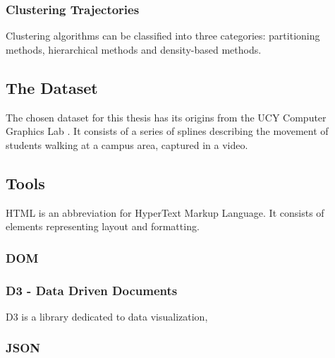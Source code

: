 \documentclass{article}
\begin{document}
\subsubsection{Clustering Trajectories}

Clustering algorithms can be classified into three
categories: partitioning methods, hierarchical methods and density-based methods.



\subsection{The Dataset}

The chosen dataset for this thesis has its origins from the UCY Computer Graphics Lab \cite{Cyprus}. It consists of a series of splines describing the movement of students walking at a campus area, captured in a video. 




    




\subsection{Tools}

HTML is an abbreviation for HyperText Markup Language. It consists of elements representing layout and formatting.  

\subsubsection{DOM}
\subsubsection{D3 - Data Driven Documents}
D3 is a library dedicated to data visualization,  

\subsubsection{JSON}
\end{document}
